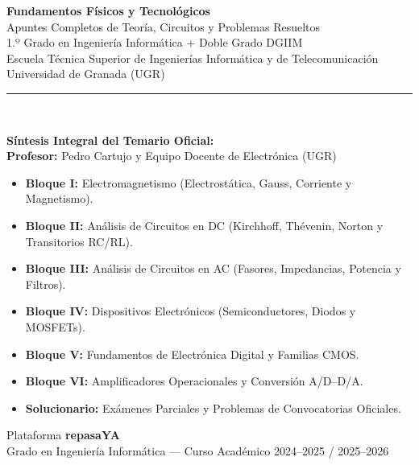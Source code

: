 \documentclass[11pt,a4paper,twoside,openright]{report}
\begin{document}
\begin{titlepage}
    \centering
    \vspace*{1.2cm}
    
    {\Huge\bfseries\color{fftDarkBlue}\textsf{Fundamentos Físicos y Tecnológicos}}\\[0.6cm]
    {\Large\textsf{Apuntes Completos de Teoría, Circuitos y Problemas Resueltos}}\\[0.4cm]
    {\large\textsf{1.º Grado en Ingeniería Informática + Doble Grado DGIIM}}\\[0.2cm]
    {\normalsize\textsf{Escuela Técnica Superior de Ingenierías Informática y de Telecomunicación}}\\[0.2cm]
    {\normalsize\textsf{Universidad de Granada (UGR)}}\\[1.2cm]
    
    \rule{0.85\textwidth}{1.5pt}\\[1.5cm]
    
    \begin{tcolorbox}[
        colback=fftLightAccent,
        colframe=fftAccent,
        width=0.9\textwidth,
        arc=4pt,
        halign=center
    ]
        \large\textbf{\color{fftDarkBlue}Síntesis Integral del Temario Oficial:}\\[8pt]
        \normalsize
        \textbf{Profesor:} Pedro Cartujo y Equipo Docente de Electrónica (UGR)\\[4pt]
        \begin{itemize}[leftmargin=1.5cm, rightmargin=1.5cm, noitemsep]
            \item \textbf{Bloque I:} Electromagnetismo (Electrostática, Gauss, Corriente y Magnetismo).
            \item \textbf{Bloque II:} Análisis de Circuitos en DC (Kirchhoff, Thévenin, Norton y Transitorios RC/RL).
            \item \textbf{Bloque III:} Análisis de Circuitos en AC (Fasores, Impedancias, Potencia y Filtros).
            \item \textbf{Bloque IV:} Dispositivos Electrónicos (Semiconductores, Diodos y MOSFETs).
            \item \textbf{Bloque V:} Fundamentos de Electrónica Digital y Familias CMOS.
            \item \textbf{Bloque VI:} Amplificadores Operacionales y Conversión A/D--D/A.
            \item \textbf{Solucionario:} Exámenes Parciales y Problemas de Convocatorias Oficiales.
        \end{itemize}
    \end{tcolorbox}
    
    \vfill
    
    {\large\textsf{Plataforma \textbf{repasaYA}}}\\[0.2cm]
    {\small\textsf{Grado en Ingeniería Informática --- Curso Académico 2024--2025 / 2025--2026}}\\[0.6cm]
\end{titlepage}
\end{document}
